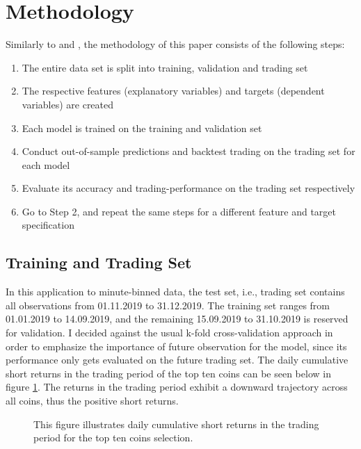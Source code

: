 \section{Methodology}
Similarly to 
\cite{krauss2019statisticalArbitrage}
and \cite{krauss2016arbitrageSandP},
the methodology of this paper consists of
the following steps:

\begin{enumerate}
    \item The entire data set is split into training, validation and trading set
    \item The respective features (explanatory variables) and targets (dependent variables) are created
    \item Each model is trained on the training and validation set
    \item Conduct out-of-sample predictions and backtest trading on the trading set for each model 
    \item Evaluate its accuracy and trading-performance on the trading set respectively
    \item Go to Step 2, and repeat the same steps for a different feature and target specification
\end{enumerate}



\subsection{Training and Trading Set} \label{ch:training_trading}
In this application to minute-binned data, the test set, i.e., trading set contains all observations from 01.11.2019 to 31.12.2019.
The training set ranges from 01.01.2019 to 14.09.2019, and the remaining 15.09.2019 to 31.10.2019 
is reserved for validation. I decided against the usual k-fold cross-validation approach 
in order to emphasize the importance of future observation for the model, since its performance only gets
evaluated on the future trading set. The daily cumulative short returns in the trading period of the top ten coins can be
seen below in figure \ref{fig:all_top_10_daily_cum_returns}. The returns in the trading period 
exhibit a downward trajectory across all coins, thus the positive short returns.

\begin{figure}[H] 
    \captionsetup{format=plain}
    \caption{
        This figure illustrates daily cumulative short returns in the trading period for the top ten coins selection.
    }
    \label{fig:all_top_10_daily_cum_returns}
\end{figure}


